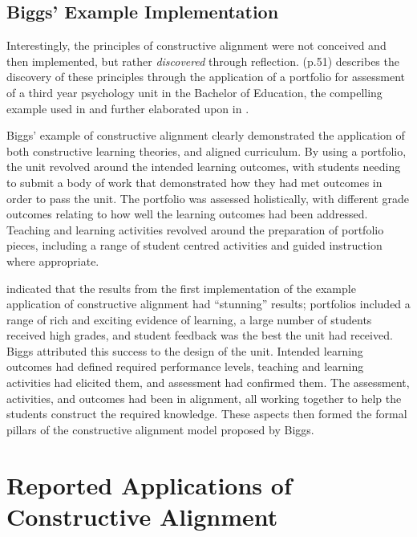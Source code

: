 
\subsection{Biggs' Example Implementation} %
\label{sub:biggs_example_implementation}

Interestingly, the principles of constructive alignment were not conceived and then implemented, but rather \emph{discovered} through reflection. \citet{Biggs:2007} (p.51) describes the discovery of these principles through the application of a portfolio for assessment of a third year psychology unit in the Bachelor of Education, the compelling example used in \citet{Biggs:1996c} and further elaborated upon in \citet{Biggs:1997}. 

Biggs' example of constructive alignment clearly demonstrated the application of both constructive learning theories, and aligned curriculum. By using a portfolio, the unit revolved around the intended learning outcomes, with students needing to submit a body of work that demonstrated how they had met outcomes in order to pass the unit. The portfolio was assessed holistically, with different grade outcomes relating to how well the learning outcomes had been addressed. Teaching and learning activities revolved around the preparation of portfolio pieces, including a range of student centred activities and guided instruction where appropriate.

\citet{Biggs:1996c} indicated that the results from the first implementation of the example application of constructive alignment had ``stunning'' results; portfolios included a range of rich and exciting evidence of learning, a large number of students received high grades, and student feedback was the best the unit had received. Biggs attributed this success to the design of the unit. Intended learning outcomes had defined required performance levels, teaching and learning activities had elicited them, and assessment had confirmed them. The assessment, activities, and outcomes had been in alignment, all working together to help the students construct the required knowledge. These aspects then formed the formal pillars of the constructive alignment model proposed by Biggs.



\clearpage
\section{Reported Applications of Constructive Alignment} %
\label{sec:reported_applications_of_constructive_alignment}

